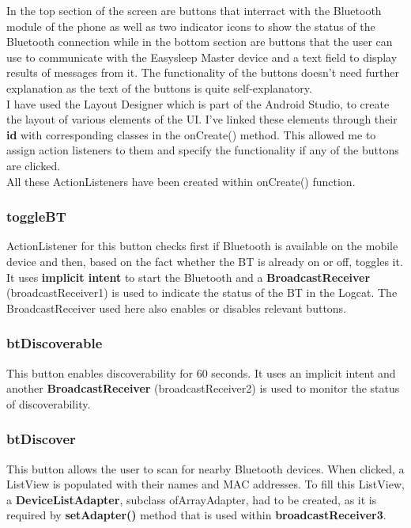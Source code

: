 \documentclass[12pt,a4paper]{article}
\begin{document}
    In the top section of the screen are buttons that interract with the Bluetooth module of the phone as well as two indicator icons to show the status of the Bluetooth connection while in the bottom section are buttons that the user can use to communicate with the Easysleep Master device and a text field to display results of messages from it. The functionality of the buttons doesn't need further explanation as the text of the buttons is quite self-explanatory.\\
    
    I have used the Layout Designer which is part of the Android Studio, to create the layout of various elements of the UI. I've linked these elements through their {\bfseries id} with corresponding classes in the onCreate() method. This allowed me to assign action listeners to them and specify the functionality if any of the buttons are clicked.\\

    All these ActionListeners have been created within onCreate() function.
    
    \subsubsection*{toggleBT}
    ActionListener for this button checks first if Bluetooth is available on the mobile device and then, based on the fact whether the BT is already on or off, toggles it. It uses {\bfseries implicit intent} to start the Bluetooth and a {\bfseries BroadcastReceiver} (broadcastReceiver1) is used to indicate the status of the BT in the Logcat. The BroadcastReceiver used here also enables or disables relevant buttons.
    
    \subsubsection*{btDiscoverable}
    This button enables discoverability for 60 seconds. It uses an implicit intent and another {\bfseries BroadcastReceiver} (broadcastReceiver2) is used to monitor the status of discoverability.
    
    \subsubsection*{btDiscover}
    This button allows the user to scan for nearby Bluetooth devices. When clicked, a ListView is populated with their names and MAC addresses. To fill this ListView, a {\bfseries DeviceListAdapter}, subclass ofArrayAdapter, had to be created, as it is required by {\bfseries setAdapter()} method that is used within {\bfseries broadcastReceiver3}. 
    
\end{document}

